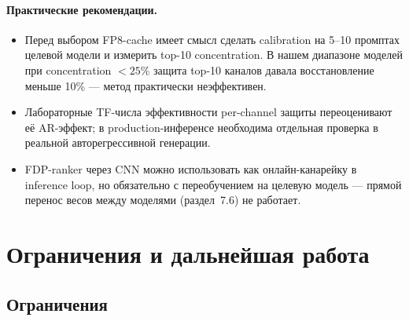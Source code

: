 \documentclass[a4paper,12pt]{article}
\begin{document}
\paragraph{Практические рекомендации.}
\begin{itemize}[leftmargin=*]
\item Перед выбором FP8-cache имеет смысл сделать calibration на
  5--10 промптах целевой модели и измерить top-10 concentration.
  В нашем диапазоне моделей при concentration $< 25\%$ защита top-10
  каналов давала восстановление меньше 10\% --- метод практически
  неэффективен.
\item Лабораторные TF-числа эффективности per-channel защиты
  переоценивают её AR-эффект; в production-инференсе необходима
  отдельная проверка в реальной авторегрессивной генерации.
\item FDP-ranker через CNN можно использовать как онлайн-канарейку в
  inference loop, но обязательно с переобучением на целевую модель ---
  прямой перенос весов между моделями (раздел~7.6) не работает.
\end{itemize}

\clearpage

\section{Ограничения и дальнейшая работа}

\subsection{Ограничения}
\end{document}
